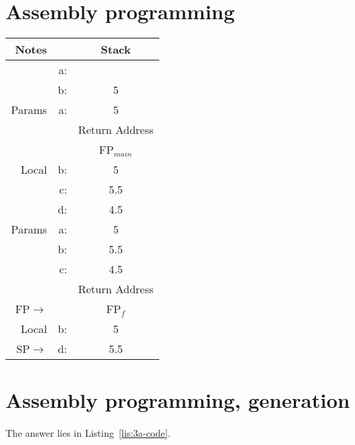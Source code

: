 \section{Assembly programming}
\begin{table}[H]
\centering
	\begin{tabular}{|r|r||c|}
	\hline
	Notes	& & Stack \\ \hline
			& a: & 		\\ \hline		
			& b: & 5	\\ \hline
	Params	& a: & 5	\\ \hline	
			& &Return Address  \\ \hline
			& &FP$_{main}$ \\ \hline
	Local	& b: & 5	\\ \hline
			& c: & 5.5	\\ \hline
			& d: & 4.5	\\ \hline
	Params	& a: & 5	\\ \hline
			& b: & 5.5	\\ \hline
			& c: & 4.5	\\ \hline
			& &Return Address \\ \hline
	FP$\rightarrow$& &FP$_f$ 	\\ \hline
	Local	& b: & 5	\\ \hline
	SP$\rightarrow$	& d: & 5.5	\\ \hline
	\end{tabular}
\end{table}


\newpage
\section{Assembly programming, generation}
The answer lies in Listing~\ref{lis:3a-code}.

